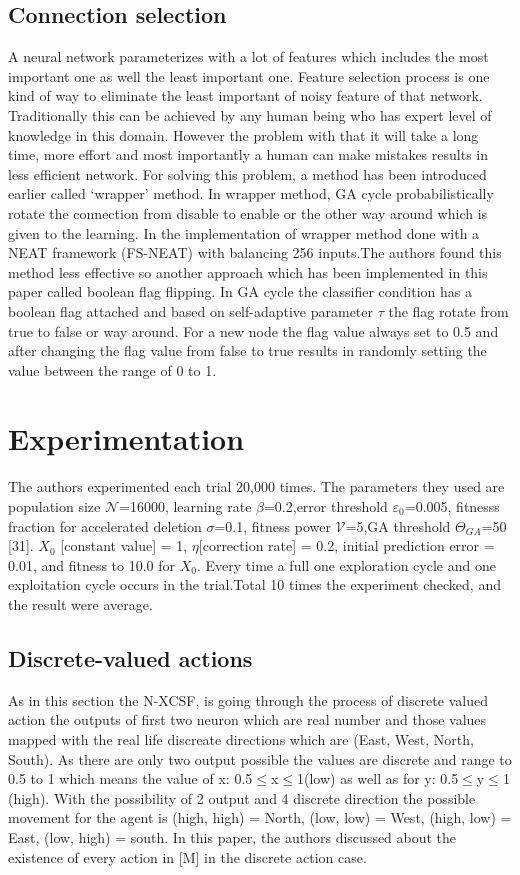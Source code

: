 \documentclass[12pt]{article}
\begin{document}
\subsection{Connection selection }
\label{sec:2}
A neural network parameterizes with a lot of features which includes the most important one as well the least important one. Feature selection process is one kind of way to eliminate the least important of noisy feature of that network. Traditionally this can be achieved by any human being who has expert level of knowledge in this domain. However the problem with that it will take a long time, more effort and most importantly a human can make mistakes results in less efficient network. For solving this problem, a method has been introduced earlier called ‘wrapper’ method.  In wrapper method, GA cycle probabilistically rotate the connection from disable to enable or the other way around which is given to the learning. In \cite{10.1145/1068009.1068210} the implementation of wrapper method done with a NEAT framework (FS-NEAT) with balancing 256 inputs.The authors found this method less effective so another approach which has been implemented in this paper called boolean flag flipping\cite{10.1145/1388969.1389010}. In GA cycle the classifier condition has a boolean flag attached and based on self-adaptive parameter $\tau$ the flag rotate from true to false or way around. For a new node the flag value always set to 0.5 and after changing the flag value from false to true results in randomly setting the value between the range of 0 to 1. 


\section{Experimentation}
\label{sec:verify}
The authors experimented each trial 20,000 times. The parameters they used are population size $\mathcal{N}$=16000, learning rate $\beta$=0.2,error threshold $\varepsilon _{0}$=0.005, fitnesss fraction for accelerated deletion $\sigma $=0.1, fitness power $\mathcal{V}$=5,GA threshold $\varTheta  _{GA} $=50 [31]. $X_0$ [constant value] = 1, $\eta$[correction rate]  = 0.2, initial prediction error  = 0.01, and fitness to 10.0 for $X_0$. Every time a full one exploration cycle and one exploitation cycle occurs in the trial.Total 10 times the experiment checked, and the result were average. 
\subsection{Discrete-valued actions}
\label{sec:verify}
As in this section the N-XCSF, is going through the process of discrete valued action the outputs of first two neuron which are real number and those values mapped with the real life discreate directions which are (East, West, North, South). As there are only two output possible the values are discrete and range to 0.5 to 1 which means the value of x: 0.5$\leq$x$\leq$1(low) as well as for y: 0.5$\leq$y$\leq$1 (high). With the possibility of 2 output and 4 discrete direction the possible movement for the agent is (high, high) = North, (low, low) = West, (high, low) = East, (low, high) = south. In this paper, the authors discussed about the existence of every action in [M] in the discrete action case. 
\end{document}
